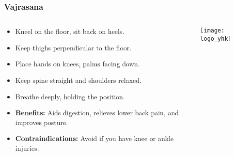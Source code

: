 \begin{frame}[fragile]\frametitle{Vajrasana}
\begin{columns}
    \begin{column}[T]{0.5\linewidth}
      \begin{itemize}
        \item Kneel on the floor, sit back on heels.
        \item Keep thighs perpendicular to the floor.
        \item Place hands on knees, palms facing down.
        \item Keep spine straight and shoulders relaxed.
        \item Breathe deeply, holding the position.
        \item \textbf{Benefits:} Aids digestion, relieves lower back pain, and improves posture.
        \item \textbf{Contraindications:} Avoid if you have knee or ankle injuries.
      \end{itemize}
    \end{column}
    \begin{column}[T]{0.5\linewidth}
        \begin{center}
        \texttt{[image: logo\_yhk]}
        \end{center}    
    \end{column}
  \end{columns}
\end{frame}

